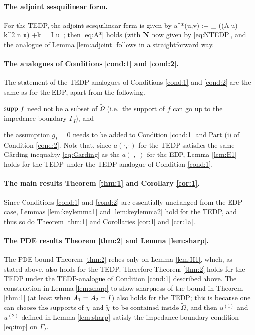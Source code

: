 \paragraph{The adjoint sesquilinear form.} For the TEDP, the adjoint sesquilinear form is given by 
\beq\label{eq:TEDPadjoint}
a^*(u,v) := \int_{\DR} 
\Big((A \grad u)\cdot\grad \vb
 - k^2 n u\vb\Big) +\ri k\int_{\Gamma_I} \gamma u\, ;
\eeq
then \eqref{eq:A*} holds (with $\mathbf{N}$ now given by \eqref{eq:NTEDP}, and the analogue of Lemma \ref{lem:adjoint} follows in a straightforward way.


\paragraph{The analogues of Conditions \ref{cond:1} and \ref{cond:2}.}
The statement of the TEDP analogues of Conditions \ref{cond:1} and \ref{cond:2} are the same as for the EDP, apart from the following.
\ben
\item
$\operatorname{supp} \,f$ need not be a subset of $\widetilde{\Omega}$ (i.e.~the support of $f$ can go up to the impedance boundary $\Gamma_I$), and
\item the assumption $g_I= 0$ needs to be added to Condition \ref{cond:1} and Part (i) of Condition \ref{cond:2}.
\een
 Note that, since $a(\cdot,\cdot)$ for the TEDP satisfies the same G\aa rding inequality \eqref{eq:Garding} as the $a(\cdot,\cdot)$ for the EDP, Lemma \ref{lem:H1} holds for the TEDP under the TEDP-analogue of Condition \ref{cond:1}.

\paragraph{The main results Theorem \ref{thm:1} and Corollary \ref{cor:1}.}
Since Conditions \ref{cond:1} and \ref{cond:2} are essentially unchanged from the EDP case, Lemmas \ref{lem:keylemma1} and \ref{lem:keylemma2} hold for the TEDP, and thus so do Theorem \ref{thm:1} and Corollaries \ref{cor:1} and \ref{cor:1a}.

\paragraph{The PDE results Theorem \ref{thm:2} and Lemma \ref{lem:sharp}.}

The PDE bound Theorem \ref{thm:2} relies only on Lemma \ref{lem:H1}, which, as stated above, also holds for the TEDP. Therefore Theorem \ref{thm:2} holds for the TEDP under the TEDP-analogue of Condition \ref{cond:1} described above. The construction in Lemma \ref{lem:sharp} to show sharpness of the bound in Theorem \ref{thm:1} (at least when $A_{1}= A_{2}= I$) also holds for the TEDP; this is because one can choose the supports of $\chi$ and $\widetilde{\chi}$ to be contained inside $\widetilde{\Omega}$, and then $u^{(1)}$ and $u^{(2)}$ defined in Lemma \ref{lem:sharp} satisfy the impedance boundary condition \eqref{eq:imp} on $\Gamma_I$.

